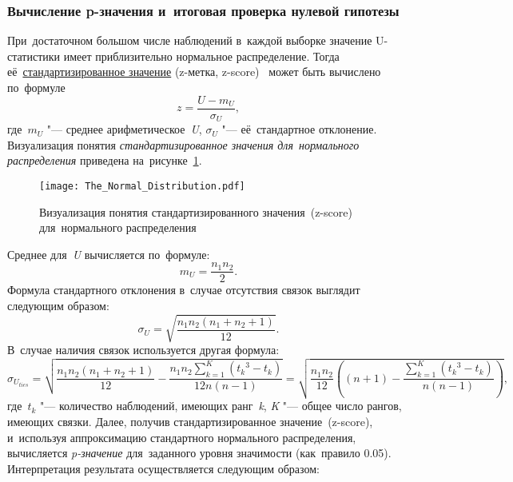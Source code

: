 \documentclass[]{scrartcl}
\begin{document}
\subsubsection{Вычисление p-значения и~итоговая проверка нулевой гипотезы}
При~достаточном большом числе наблюдений в~каждой выборке значение U-статистики имеет приблизительно нормальное распределение. Тогда её~\href{https://en.wikipedia.org/wiki/Standard_score}{стандартизированное значение} (z-метка, \foreignlanguage{english}{z-score})~\cite{Wiki:z-score} может быть вычислено по~формуле
\begin{equation}\label{eq:z-score}
z = \frac{U-m_{U}}{\sigma_{U}},
\end{equation}
где~${\textstyle m_{U}}$ "--- среднее арифметическое~\textit{U}, ${\textstyle \sigma_{U}}$ "--- её~стандартное отклонение. Визуализация понятия \emph{стандартизированное значения для~нормального распределения} приведена на~рисунке~\ref{fig:z-score}.
\begin{figure}[ht]
	\centering
	\texttt{[image: The\_Normal\_Distribution.pdf]}
	\caption{Визуализация понятия стандартизированного значения~(z-score) для~нормального распределения \cite{Wiki:z-score}}\label{fig:z-score}
\end{figure}
Среднее для~\textit{U} вычисляется по~формуле:
\begin{equation}\label{eq:U-mean}
m_{U} = \frac{n_{1}n_{2}}{2}.
\end{equation}
Формула стандартного отклонения в~случае отсутствия связок выглядит следующим образом:
\begin{equation}\label{eq:standard-deviation-no-ties}
\sigma_{U} =  \sqrt{\frac{n_{1}n_{2}(n_{1}+n_{2}+1)}{12}}.
\end{equation}
В~случае наличия связок используется другая формула:
\begin{equation}\label{eq:standard-deviation-ties}
\sigma_{U_{ties}} = \sqrt{\frac{n_{1}n_{2}(n_{1}+n_{2}+1)}{12} - \frac{n_{1}n_{2}\sum_{k=1}^{K}({t_{k}}^{3} - t_{k})}{12n(n-1)}} = \sqrt{\frac{n_{1}n_{2}}{12} \left((n+1)-\frac{\sum_{k=1}^{K}({t_{k}}^{3} - t_{k})}{n(n-1)}\right)},
\end{equation}
где~${\textstyle t_{k}}$ "--- количество наблюдений, имеющих ранг~\textit{k}, \textit{K} "--- общее число рангов, имеющих связки.
Далее, получив стандартизированное значение~(z-score), и~используя аппроксимацию стандартного нормального распределения, вычисляется \textit{p-значение} для~заданного уровня значимости (как~правило 0.05). Интерпретация результата осуществляется следующим образом:
\end{document}
